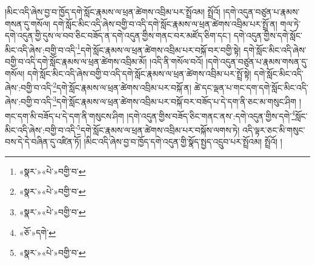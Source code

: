 །མིང་འདི་ཞེས་བྱ་བ་ཁྱོད་དགེ་སློང་རྣམས་ལ་ཕྲན་ཚེགས་འབྲིམ་པར་སྤྲོའམ། སྤྲོའོ། །དགེ་འདུན་བཙུན་པ་རྣམས་གསན་དུ་གསོལ། དགེ་སློང་མིང་འདི་ཞེས་བགྱི་བ་འདི་དགེ་སློང་རྣམས་ལ་ཕྲན་ཚེགས་འབྲིམ་པར་སྤྲོ་ན། གལ་ཏེ་དགེ་འདུན་གྱི་དུས་ལ་བབ་ཅིང་བཟོད་ན་དགེ་འདུན་གྱིས་གནང་བར་མཛོད་ཅིག་དང་། དགེ་འདུན་གྱིས་དགེ་སློང་མིང་འདི་ཞེས་:བགྱི་བ་འདི་\footnote{«སྣར་»«པེ་»བགྱི་བ་}དགེ་སློང་རྣམས་ལ་ཕྲན་ཚེགས་འབྲིམ་པར་བསྐོ་བར་བགྱི་སྟེ། དགེ་སློང་མིང་འདི་ཞེས་བགྱི་བ་འདི་དགེ་སློང་རྣམས་ལ་ཕྲན་ཚེགས་འབྲིམ་མོ། །འདི་ནི་གསོལ་བའོ། །དགེ་འདུན་བཙུན་པ་རྣམས་གསན་དུ་གསོལ། དགེ་སློང་མིང་འདི་ཞེས་བགྱི་བ་འདི་དགེ་སློང་རྣམས་ལ་ཕྲན་ཚེགས་འབྲིམ་པར་སྤྲོ་སྟེ། དགེ་སློང་མིང་འདི་ཞེས་:བགྱི་བ་འདི་\footnote{«སྣར་»«པེ་»བགྱི་བ་}དགེ་སློང་རྣམས་ལ་ཕྲན་ཚེགས་འབྲིམ་པར་བསྐོ་ན། ཚེ་དང་ལྡན་པ་གང་དག་དགེ་སློང་མིང་འདི་ཞེས་:བགྱི་བ་འདི་\footnote{«སྣར་»«པེ་»བགྱི་བ་}དགེ་སློང་རྣམས་ལ་ཕྲན་ཚེགས་འབྲིམ་པར་བསྐོ་བར་བཟོད་པ་དེ་དག་ནི་ཅང་མ་གསུང་ཤིག །གང་དག་མི་བཟོད་པ་དེ་དག་ནི་གསུངས་ཤིག །དགེ་འདུན་གྱིས་བཟོད་ཅིང་གནང་ནས་:དགེ་འདུན་གྱིས་དགེ་\footnote{«ཅོ་»དགེ་}སློང་མིང་འདི་ཞེས་:བགྱི་བ་འདི་\footnote{«སྣར་»«པེ་»བགྱི་བ་}དགེ་སློང་རྣམས་ལ་ཕྲན་ཚེགས་འབྲིམ་པར་བསྐོས་ལགས་ཏེ། འདི་ལྟར་ཅང་མི་གསུང་བས་དེ་དེ་བཞིན་དུ་འཛིན་ཏོ། །མིང་འདི་ཞེས་བྱ་བ་ཁྱོད་དགེ་འདུན་གྱི་སྣོད་སྤྱད་འདྲུབ་པར་སྤྲོའམ། སྤྲོའོ། །
